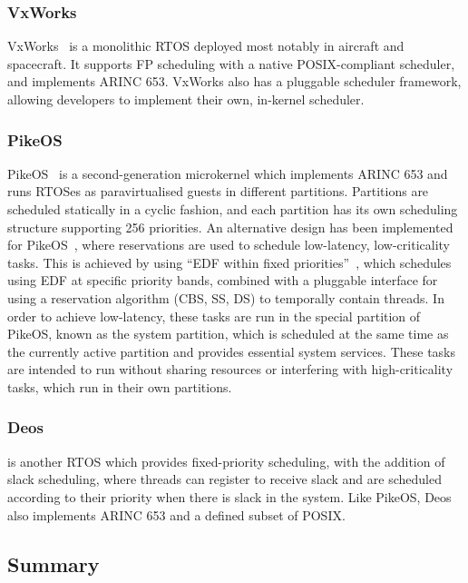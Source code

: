 \subsubsection{VxWorks}

VxWorks~\citep{VxWorks_08} is a monolithic \gls{RTOS} deployed most notably in aircraft
and spacecraft.  It supports \gls{FP} scheduling with a native POSIX-compliant scheduler, and
implements ARINC 653.  VxWorks
also has a pluggable scheduler framework, allowing developers to implement their own, in-kernel
scheduler.

\subsubsection{PikeOS}

PikeOS~\citep{PikeOS:URL} is a second-generation microkernel which implements ARINC 653 
and runs RTOSes as paravirtualised guests in different partitions. Partitions are scheduled
statically in a cyclic fashion, and each partition has its own scheduling structure supporting 256
priorities.
An alternative design has been implemented for PikeOS~\citep{Vanga_BTB_17}, where reservations are
used to schedule low-latency, low-criticality tasks.
This is achieved by using ``\gls{EDF} within fixed priorities''~\citep{Harbour_Palencia_03}, which
schedules using EDF at specific priority bands, combined with a pluggable interface for using a
reservation algorithm (\eg \gls{CBS}, \gls{SS}, \gls{DS}) to temporally contain threads. In order to achieve low-latency, these tasks are run
in the special partition of PikeOS, known as the system partition, which is scheduled at the same
time as the currently active partition and provides essential system services. These tasks
are intended to run without sharing resources or interfering with high-criticality tasks, which run
in their own partitions.

\subsubsection{Deos}

\citet{Deos:URL} is another RTOS which provides fixed-priority scheduling, with the addition of slack
scheduling, where threads can register to receive slack and are scheduled according to their
priority when there is slack in the system. Like PikeOS, Deos also implements ARINC 653 and a
defined subset of POSIX.

\subsection{Summary}
\label{f:fixed-prio-dom}

